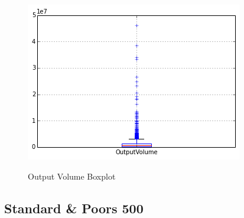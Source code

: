 \begin{figure}[bth]
  \myfloatalign
  {\includegraphics[width=1\linewidth]
    {gfx/output-volume-boxplot}}
  \caption{Output Volume
    Boxplot}
  \label{fig:output-volume-boxplot}
\end{figure}

\clearpage

\subsection{Standard \& Poors 500}
\label{sec:standard-and-poors-500}

